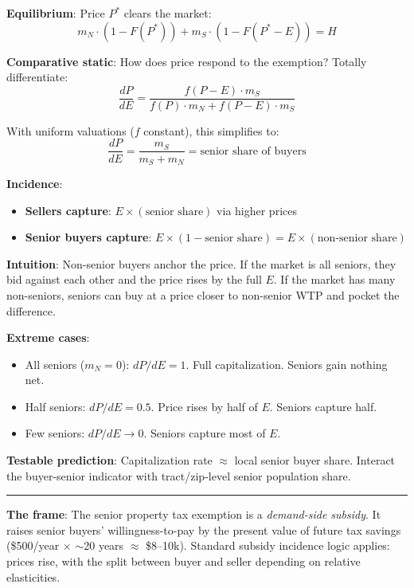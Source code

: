 \documentclass[11pt]{article}
\begin{document}
\textbf{Equilibrium}: Price $P^*$ clears the market:
\[
m_N \cdot (1 - F(P^*)) + m_S \cdot (1 - F(P^* - E)) = H
\]

\textbf{Comparative static}: How does price respond to the exemption? Totally differentiate:
\[
\frac{dP}{dE} = \frac{f(P-E) \cdot m_S}{f(P) \cdot m_N + f(P-E) \cdot m_S}
\]

With uniform valuations ($f$ constant), this simplifies to:
\[
\frac{dP}{dE} = \frac{m_S}{m_S + m_N} = \text{senior share of buyers}
\]

\textbf{Incidence}:
\begin{itemize}
    \item \textbf{Sellers capture}: $E \times (\text{senior share})$ via higher prices
    \item \textbf{Senior buyers capture}: $E \times (1 - \text{senior share}) = E \times (\text{non-senior share})$
\end{itemize}

\textbf{Intuition}: Non-senior buyers anchor the price. If the market is all seniors, they bid against each other and the price rises by the full $E$. If the market has many non-seniors, seniors can buy at a price closer to non-senior WTP and pocket the difference.

\textbf{Extreme cases}:
\begin{itemize}
    \item All seniors ($m_N = 0$): $dP/dE = 1$. Full capitalization. Seniors gain nothing net.
    \item Half seniors: $dP/dE = 0.5$. Price rises by half of $E$. Seniors capture half.
    \item Few seniors: $dP/dE \to 0$. Seniors capture most of $E$.
\end{itemize}

\textbf{Testable prediction}: Capitalization rate $\approx$ local senior buyer share. Interact the buyer-senior indicator with tract/zip-level senior population share.

\vspace{1em}
\hrule
\vspace{1em}

\textbf{The frame}: The senior property tax exemption is a \textit{demand-side subsidy}. It raises senior buyers' willingness-to-pay by the present value of future tax savings (\$500/year $\times$ $\sim$20 years $\approx$ \$8--10k). Standard subsidy incidence logic applies: prices rise, with the split between buyer and seller depending on relative elasticities.
\end{document}
